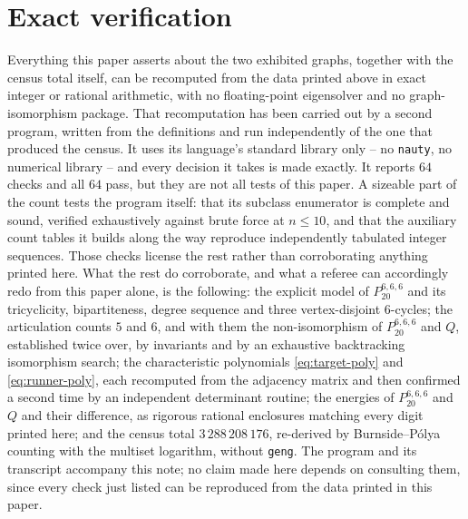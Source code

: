 \documentclass[11pt]{amsart}
\newcommand{\target}{P_{20}^{6,6,6}}
\begin{document}
\section{Exact verification}

Everything this paper asserts about the two exhibited graphs, together
with the census total itself, can be recomputed from the data printed
above in exact integer or rational arithmetic, with no floating-point
eigensolver and no graph-isomorphism package. That recomputation has
been carried out by a second program, written from the definitions and
run independently of the one that produced the census.
It uses its language's standard library only -- no \texttt{nauty}, no
numerical library -- and every decision it takes is made exactly. It
reports $64$ checks and all $64$ pass, but they are not all tests of
this paper. A sizeable part of the count tests the program itself:
that its subclass enumerator is complete and sound, verified
exhaustively against brute force at $n\le10$, and that the auxiliary
count tables it builds along the way reproduce independently tabulated
integer sequences. Those checks license the rest rather than
corroborating anything printed here. What the rest do corroborate, and
what a referee can accordingly redo from this paper alone, is the
following: the explicit model of $\target$ and its
tricyclicity, bipartiteness, degree sequence and three vertex-disjoint
$6$-cycles; the articulation counts $5$ and $6$, and with them the
non-isomorphism of $\target$ and $Q$, established twice over, by
invariants and by an exhaustive backtracking isomorphism search; the
characteristic polynomials
\eqref{eq:target-poly} and \eqref{eq:runner-poly}, each recomputed from
the adjacency matrix and then confirmed a second time by an independent
determinant routine; the energies of $\target$ and $Q$ and their
difference, as rigorous rational enclosures matching every digit
printed here; and the census total $3\,288\,208\,176$, re-derived by
Burnside--P\'olya counting with the multiset logarithm, without
\texttt{geng}. The program and its transcript accompany this note; no
claim made here depends on consulting them, since every check just
listed can be reproduced from the data printed in this paper.
\end{document}
